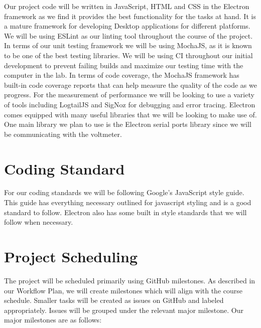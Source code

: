 \documentclass{article}
\begin{document}
Our project code will be written in JavaScript, HTML and CSS in the Electron framework as 
we find it provides the best functionality for the tasks at hand. It is a mature framework for developing Desktop applications for different platforms.
We will be using ESLint as our linting tool throughout the course of the project. In terms of our unit testing 
framework we will be using MochaJS, as it is known to be one of the best testing libraries. 
We will be using CI throughout our initial development to prevent failing builds and maximize our testing time with the computer in the lab. In terms of code coverage, the MochaJS 
framework has built-in code coverage reports that can help measure the quality of the code as we progress. For the
measurement of performance we will be looking to use a variety of tools including LogtailJS and SigNoz 
for debugging and error tracing. Electron comes equipped with many useful libraries that we 
will be looking to make use of. One main library we plan to use is the Electron serial ports library since we will be communicating with the voltmeter.
  
\section{Coding Standard}
  
For our coding standards we will be following Google's JavaScript style guide. This guide has everything
necessary outlined for javascript styling and is a good standard to follow. Electron also has some built in 
style standards that we will follow when necessary.

\section{Project Scheduling}

\noindent The project will be scheduled primarily using GitHub milestones. As described in our Workflow Plan, we will create milestones which will align with the course schedule. Smaller tasks will be created as issues on GitHub and labeled appropriately. Issues will be grouped under the relevant major milestone. Our major milestones are as follows:
\end{document}
